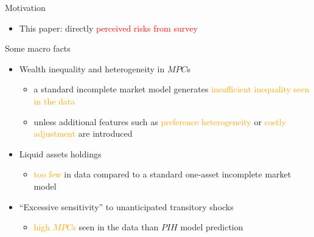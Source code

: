\documentclass{beamer}
\begin{document}
\begin{frame}{Motivation}
\begin{itemize}
\begin{itemize}
		\item This paper: directly \textcolor{red}{perceived risks from survey}
	\end{itemize}
	\end{itemize}
\end{frame}


\begin{frame}{Some macro facts}
	\begin{itemize}
	\item Wealth inequality and heterogeneity in $MPC$s
	\begin{itemize}
		\item a standard incomplete market model generates \textcolor{orange}{insufficient inequality seen in the data}
		\item unless additional features such as \textcolor{orange}{preference heterogeneity} or \textcolor{orange}{costly adjustment} are introduced 
	\end{itemize}
\item Liquid assets holdings 
\begin{itemize}
	\item \textcolor{orange}{too few} in data compared to a standard one-asset incomplete market model 
\end{itemize}
\item ``Excessive sensitivity'' to unanticipated transitory shocks 
\begin{itemize}
	\item  \textcolor{orange}{high $MPC$s} seen in the data than $PIH$ model prediction 
\end{itemize}
	\end{itemize}
\end{frame}
\end{document}
